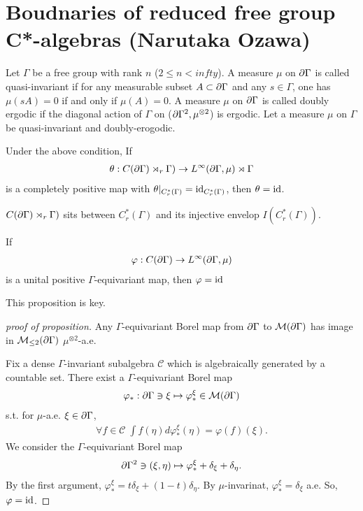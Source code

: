 \section{Boudnaries of reduced free group C*-algebras (Narutaka Ozawa)}
\cite{ozawa2006boundaries}
Let $\Gamma$ be a free group with rank $n$ ($2 \leq n < infty$).
A measure $\mu$ on $\frak{\partial} \Gamma$ is called quasi-invariant if for any measurable subset $A \subset \frak{\partial} \Gamma$ and any $s \in \Gamma$,
one has $\mu (s A) = 0$ if and only if $\mu (A) = 0$.
A measure $\mu$ on $\frak{\partial} \Gamma$ is called doubly ergodic if the diagonal action of $\Gamma$ on ($\frak{\partial} \Gamma^2,\mu^{\otimes 2}$) is ergodic.
Let a measure $\mu$ on $\Gamma$ be quasi-invariant and doubly-erogodic.

\begin{theorem}
  Under the above condition,
  If
  \begin{align*}
    \theta : C(\frak{\partial} \Gamma) \rtimes_r \Gamma) \rightarrow L^\infty(\frak{\partial} \Gamma, \mu) \rtimes \Gamma
  \end{align*}
  is a completely positive map with $\theta |_{C_r^*(\Gamma)} = {\rm id}_{C_r^*(\Gamma)}$, then $\theta = {\rm id}$.
\end{theorem}

\begin{corollary}
  $C(\frak{\partial} \Gamma) \rtimes_r \Gamma)$ sits between $C_r^*(\Gamma)$ and its injective envelop $I(C_r^*(\Gamma))$.
\end{corollary}

\begin{proposition}
  If
  \begin{align*}
    \varphi : C(\frak{\partial} \Gamma) \rightarrow L^\infty(\frak{\partial} \Gamma, \mu)
  \end{align*}
  is a unital positive $\Gamma$-equivariant map, then $\varphi = {\rm id}$
\end{proposition}

This proposition is key.

\begin{proof}[proof of proposition]
  Any $\Gamma$-equivariant Borel map from $\frak{\partial} \Gamma$ to $\mathcal{M}(\frak{\partial} \Gamma)$ has image in $\mathcal{M}_{\leq 2}(\frak{\partial} \Gamma)$ $\mu^{\otimes 2}$-a.e.

  Fix a dense $\Gamma$-invariant subalgebra $\mathcal{C}$ which is algebraically generated by a countable set.
  There exist a $\Gamma$-equivariant Borel map
  \begin{align*}
    \varphi_* : \frak{\partial} \Gamma \ni \xi \mapsto \varphi_*^\xi \in \mathcal{M}(\frak{\partial} \Gamma)
  \end{align*}
  s.t. for $\mu$-a.e. $\xi \in \frak{\partial} \Gamma$,
  \begin{align*}
    \forall f \in \mathcal{C} \; \int f(\eta) d \varphi_*^\xi(\eta) = \varphi(f)(\xi).
  \end{align*}
  We consider the $\Gamma$-equivariant Borel map
  \begin{align*}
    \frak{\partial} \Gamma^2 \ni (\xi,\eta) \mapsto \varphi_*^\xi + \delta_\xi + \delta_\eta.   
  \end{align*}
  By the first argument, $\varphi_*^\xi = t \delta_\xi + (1-t) \delta_\eta$.
  By $\mu$-invarinat, $\varphi_*^\xi = \delta_\xi$ a.e.
  So, $\varphi = {\rm id}$.
\end{proof}

